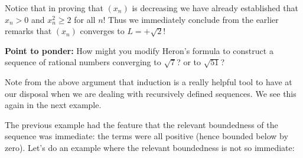 \documentclass[11pt,dvipsnames]{book}
\numberwithin{equation}{section} %
\numberwithin{figure}{section} %
\numberwithin{table}{section} %
\begin{document}
\begin{example}
Notice that in proving that $(x_n)$ is decreasing we have already established that $x_n > 0$ and $x_n^2 \geq 2$ for all $n$! Thus we immediately conclude from the earlier remarks that $(x_n)$ converges to $L= +\sqrt{2}$!
\end{example}
{\bf Point to ponder:} How might you modify Heron's formula to construct a sequence of rational numbers converging to $\sqrt{7}$? or to $\sqrt{51}$?

Note from the above argument that induction is a really helpful tool to have at our disposal when we are dealing with recursively defined sequences. We see this again in the next example.

The previous example had the feature that the relevant boundedness of the sequence was immediate: the terms were all positive (hence bounded below by zero). Let's do an example where the relevant boundedness is not so immediate:
\end{document}
